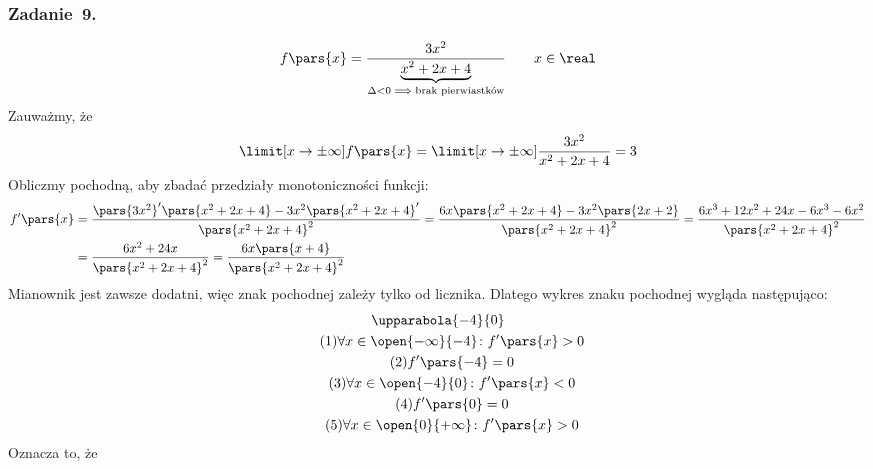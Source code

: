 \subsubsection*{Zadanie~9.}
\begin{equation*}
    f\pars{x} = \frac{3x^2}{\underbrace{x^2 + 2x + 4}_{\Delta < 0 \implies \text{brak pierwiastków}}} \qquad x \in \real
\end{equation*}
Zauważmy, że
\begin{equation*}
    \limit[x \to \pm\infty] f\pars{x}
        = \limit[x \to \pm\infty] \frac{3x^2}{x^2 + 2x + 4}
        = 3
\end{equation*}
Obliczmy pochodną, aby zbadać przedziały monotoniczności funkcji:
\begin{equation*}
    \begin{split}
        f'\pars{x}
            &= \frac{\pars{3x^2}'\pars{x^2 + 2x + 4} - 3x^2\pars{x^2 + 2x + 4}'}{\pars{x^2 + 2x + 4}^2}
            = \frac{6x\pars{x^2 + 2x + 4} - 3x^2\pars{2x + 2}}{\pars{x^2 + 2x + 4}^2}
            = \frac{6x^3 + 12x^2 + 24x - 6x^3 - 6x^2}{\pars{x^2 + 2x + 4}^2}\\
            &= \frac{6x^2 + 24x}{\pars{x^2 + 2x + 4}^2}
            = \frac{6x\pars{x + 4}}{\pars{x^2 + 2x + 4}^2}
    \end{split}
\end{equation*}
Mianownik jest zawsze dodatni, więc znak pochodnej zależy tylko od licznika. Dlatego wykres znaku pochodnej wygląda następująco:
\begin{gather*}
    \upparabola{-4}{0}\\
    \tag{\(1\)} \forall x \in \open{-\infty}{-4}\colon f'\pars{x} > 0 \label{2020_11_06:9:first_increase}\\
    \tag{\(2\)} f'\pars{-4} = 0 \label{2020_11_06:9:first_zero}\\
    \tag{\(3\)} \forall x \in \open{-4}{0}\colon f'\pars{x} < 0 \label{2020_11_06:9:decrease}\\
    \tag{\(4\)} f'\pars{0} = 0 \label{2020_11_06:9:second_zero}\\
    \tag{\(5\)} \forall x \in \open{0}{+\infty}\colon f'\pars{x} > 0 \label{2020_11_06:9:second_increase}
\end{gather*}
Oznacza to, że
